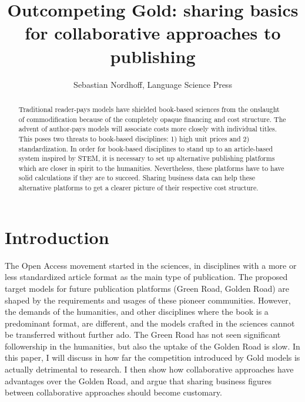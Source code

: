 \documentclass[12pt]{article}
\title{Outcompeting Gold: sharing basics for collaborative approaches to publishing}
\author{Sebastian Nordhoff, Language Science Press}
\date{}
\begin{document}
\maketitle

\begin{abstract}
Traditional reader-pays models have shielded book-based sciences from the onslaught of commodification because of the completely opaque financing and cost structure. 
The advent of author-pays models will associate costs more closely with individual titles. This poses two threats to book-based disciplines:
1) high unit prices and  
2) standardization. In order for book-based disciplines to stand up to an article-based system inspired by STEM, it is necessary to set up alternative publishing platforms which are closer in spirit to the humanities. Nevertheless, these platforms have to have solid calculations if they are to succeed. Sharing business data can help these alternative platforms to get a clearer picture of their respective cost structure. 
\end{abstract}

\section{Introduction}
The Open Access movement started in the sciences, in disciplines with a more or less standardized article format as the main type of publication. The proposed target models for future publication platforms (Green Road, Golden Road) are shaped by the requirements and usages of these pioneer communities. However, the demands of the humanities, and other disciplines where the book is a predominant format, are different, and the models crafted in the sciences cannot be transferred without further ado. The Green Road has not seen significant followership in the humanities, but also the uptake of the Golden Road is slow. In this paper, I will discuss in how far the competition introduced by Gold models is actually detrimental to research. I then show how collaborative approaches have advantages over the Golden Road, and argue that sharing business figures between collaborative approaches should become customary. 
\end{document}
